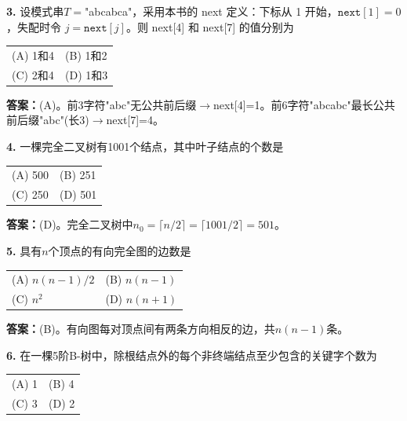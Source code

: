 \noindent\textbf{3.} 设模式串$T=$"abcabca"，采用本书的 next 定义：下标从 1 开始，$\texttt{next}[1]=0$，失配时令 $j=\texttt{next}[j]$。则 next[4] 和 next[7] 的值分别为
\begin{center}
\begin{tabular}{ll}
(A) 1和4 & (B) 1和2 \\[6pt]
(C) 2和4 & (D) 1和3
\end{tabular}
\end{center}

\ifshowsolutions\par\noindent\textbf{答案：}(A)。前3字符"abc"无公共前后缀$\to$next[4]=1。前6字符"abcabc"最长公共前后缀"abc"(长3)$\to$next[7]=4。\else \answerarea \fi

\vspace{6pt}

\noindent\textbf{4.} 一棵完全二叉树有1001个结点，其中叶子结点的个数是
\begin{center}
\begin{tabular}{ll}
(A) 500 & (B) 251 \\[6pt]
(C) 250 & (D) 501
\end{tabular}
\end{center}

\ifshowsolutions\par\noindent\textbf{答案：}(D)。完全二叉树中$n_0=\lceil n/2\rceil=\lceil1001/2\rceil=501$。\else \answerarea \fi

\vspace{6pt}

\noindent\textbf{5.} 具有$n$个顶点的有向完全图的边数是
\begin{center}
\begin{tabular}{ll}
(A) $n(n-1)/2$ & (B) $n(n-1)$ \\[6pt]
(C) $n^2$ & (D) $n(n+1)$
\end{tabular}
\end{center}

\ifshowsolutions\par\noindent\textbf{答案：}(B)。有向图每对顶点间有两条方向相反的边，共$n(n-1)$条。\else \answerarea \fi

\vspace{6pt}

\noindent\textbf{6.} 在一棵5阶B-树中，除根结点外的每个非终端结点至少包含的关键字个数为
\begin{center}
\begin{tabular}{ll}
(A) 1 & (B) 4 \\[6pt]
(C) 3 & (D) 2
\end{tabular}
\end{center}

